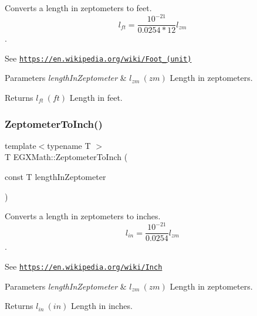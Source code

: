 Converts a length in zeptometers to feet. \[ l_{ft}= \frac{10^{-21}}{0.0254 * 12} l_{zm} \]. 

See \href{https://en.wikipedia.org/wiki/Foot_(unit)}{\tt https\+://en.\+wikipedia.\+org/wiki/\+Foot\+\_\+(unit)} 
\begin{DoxyParams}{Parameters}
{\em length\+In\+Zeptometer} & $ l_{zm}\ (zm)$ Length in zeptometers. \\
\hline
\end{DoxyParams}
\begin{DoxyReturn}{Returns}
$ l_{ft}\ (ft)$ Length in feet. 
\end{DoxyReturn}
\mbox{\label{group___e_g_x_math-_conversions-_length_conversions-_s_i-_zeptometer-_imperial_ga6bd6b3ee6932c6aa40442a9bff2580cb}} 
\subsubsection{\texorpdfstring{Zeptometer\+To\+Inch()}{ZeptometerToInch()}}
{\footnotesize\ttfamily template$<$typename T $>$ \\
T E\+G\+X\+Math\+::\+Zeptometer\+To\+Inch (\begin{DoxyParamCaption}\item[{const T}]{length\+In\+Zeptometer }\end{DoxyParamCaption})}



Converts a length in zeptometers to inches. \[ l_{in}= \frac{10^{-21}}{0.0254} l_{zm} \]. 

See \href{https://en.wikipedia.org/wiki/Inch}{\tt https\+://en.\+wikipedia.\+org/wiki/\+Inch} 
\begin{DoxyParams}{Parameters}
{\em length\+In\+Zeptometer} & $ l_{zm}\ (zm)$ Length in zeptometers. \\
\hline
\end{DoxyParams}
\begin{DoxyReturn}{Returns}
$ l_{in}\ (in)$ Length in inches. 
\end{DoxyReturn}
\mbox{\label{group___e_g_x_math-_conversions-_length_conversions-_s_i-_zeptometer-_imperial_ga68abfac4247069bdffc24002b0636495}} 
